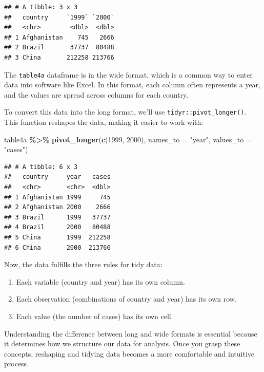 \documentclass[
]{book}
\newenvironment{Shaded}{\begin{snugshade}}{\end{snugshade}}
\newcommand{\AttributeTok}[1]{\textcolor[rgb]{0.13,0.29,0.53}{#1}}
\newcommand{\FunctionTok}[1]{\textcolor[rgb]{0.13,0.29,0.53}{\textbf{#1}}}
\newcommand{\NormalTok}[1]{#1}
\newcommand{\SpecialCharTok}[1]{\textcolor[rgb]{0.81,0.36,0.00}{\textbf{#1}}}
\newcommand{\StringTok}[1]{\textcolor[rgb]{0.31,0.60,0.02}{#1}}
\begin{document}
\begin{verbatim}
## # A tibble: 3 x 3
##   country     `1999` `2000`
##   <chr>        <dbl>  <dbl>
## 1 Afghanistan    745   2666
## 2 Brazil       37737  80488
## 3 China       212258 213766
\end{verbatim}

The \texttt{table4a} dataframe is in the wide format, which is a common way to enter data into software like Excel. In this format, each column often represents a year, and the values are spread across columns for each country.

To convert this data into the long format, we'll use \texttt{tidyr::pivot\_longer()}. This function reshapes the data, making it easier to work with:

\begin{Shaded}
\begin{Highlighting}[]
\NormalTok{table4a }\SpecialCharTok{\%\textgreater{}\%} 
  \FunctionTok{pivot\_longer}\NormalTok{(}\FunctionTok{c}\NormalTok{(}\StringTok{\textasciigrave{}}\AttributeTok{1999}\StringTok{\textasciigrave{}}\NormalTok{, }\StringTok{\textasciigrave{}}\AttributeTok{2000}\StringTok{\textasciigrave{}}\NormalTok{), }\AttributeTok{names\_to =} \StringTok{"year"}\NormalTok{, }\AttributeTok{values\_to =} \StringTok{"cases"}\NormalTok{)}
\end{Highlighting}
\end{Shaded}

\begin{verbatim}
## # A tibble: 6 x 3
##   country     year   cases
##   <chr>       <chr>  <dbl>
## 1 Afghanistan 1999     745
## 2 Afghanistan 2000    2666
## 3 Brazil      1999   37737
## 4 Brazil      2000   80488
## 5 China       1999  212258
## 6 China       2000  213766
\end{verbatim}

Now, the data fulfills the three rules for tidy data:

\begin{enumerate}
\def\labelenumi{\arabic{enumi}.}
\item
  Each variable (country and year) has its own column.
\item
  Each observation (combinations of country and year) has its own row.
\item
  Each value (the number of cases) has its own cell.
\end{enumerate}

Understanding the difference between long and wide formats is essential because it determines how we structure our data for analysis. Once you grasp these concepts, reshaping and tidying data becomes a more comfortable and intuitive process.
\end{document}
